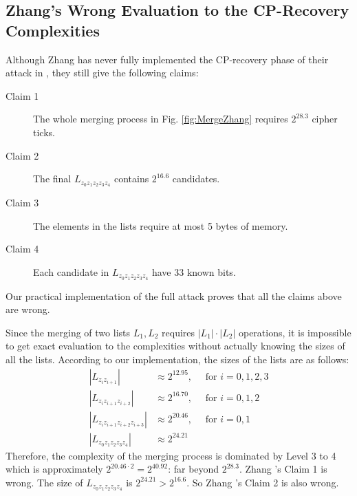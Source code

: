 \subsection{Zhang's Wrong Evaluation to the CP-Recovery Complexities}\label{sec:ZhangWrongCompAnalysis}
Although Zhang \etal has never fully implemented the CP-recovery phase of their attack in \cite{AC:Zhang19}, they still give the following claims:
\begin{description}
  \item[Claim 1] The whole merging process in Fig. \ref{fig:MergeZhang} requires $2^{28.3}$ cipher ticks.
  \item[Claim 2] The final $L_{z_0z_1z_2z_3z_4}$ contains $2^{16.6}$ candidates.
  \item[Claim 3] The elements in the lists require at most 5 bytes of memory.
  \item[Claim 4] Each candidate in $L_{z_0z_1z_2z_3z_4}$ have 33 known bits.
\end{description}
Our practical implementation of the full attack proves that all the claims above are wrong.


Since the merging of two lists $L_1,L_2$ requires $|L_1|\cdot |L_2|$ operations, it is impossible to get exact evaluation to the complexities without actually knowing the sizes of all the lists.
According to our implementation, the sizes of the lists are as follows:
\begin{equation}\label{eq:ListSizes}
  \begin{aligned}
  |L_{z_iz_{i+1}}| &\approx 2^{12.95},\quad \text{ for } i=0,1,2, 3 \\
  |L_{z_iz_{i+1}z_{i+2}}| & \approx 2^{16.70},  \quad \text{ for } i=0,1, 2\\
  |L_{z_iz_{i+1}z_{i+2}z_{i+3}}| & \approx 2^{20.46},  \quad \text{ for } i=0, 1\\
  |L_{z_0z_{1}z_{2}z_{3}z_{4}}| & \approx 2^{24.21}
  \end{aligned}
\end{equation}
Therefore, the complexity of the merging process is dominated by Level 3 to 4 which is approximately $2^{20.46\cdot 2}=2^{40.92}$: far beyond $2^{28.3}$.
Zhang \etal's Claim 1 is wrong.
The size of $L_{z_0z_1z_2z_3z_4}$ is $2^{24.21}> 2^{16.6}$.
So Zhang \etal's Claim 2 is also wrong.

